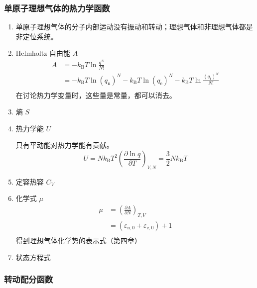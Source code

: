\subsubsection{单原子理想气体的热力学函数}

\begin{enumerate}
    \item 单原子理想气体的分子内部运动没有振动和转动；理想气体和非理想气体都是非定位系统。
    \item Helmholtz 自由能 $A$
    \begin{equation}
        \begin{aligned}
            A &= -k_\mathrm{B} T \ln{\frac{q^N}{N!}} \\
            &= -k_\mathrm{B} T \ln{\left(q_{\mathrm{n}}\right)^N}
            -k_\mathrm{B} T \ln{\left(q_{\mathrm{e}}\right)^N}
            -k_\mathrm{B} T \ln{\frac{\left(q_{\mathrm{t}}\right)^N}{N!}} \\
        \end{aligned}
    \end{equation}
    在讨论热力学变量时，这些量是常量，都可以消去。
    \item 熵 $S$
    \item 热力学能 $U$
    
    只有平动能对热力学能有贡献。
    \begin{equation}
        U = N k_\mathrm{B} T^2 \left(\frac{\partial \ln{q}}{\partial T}\right)_{V,N} = \frac32 N k_\mathrm{B} T
    \end{equation}
    \item 定容热容 $C_V$
    \item 化学式 $\mu$
    \begin{equation}
        \begin{aligned}
            \mu &= \left(\frac{\partial A}{\partial N}\right)_{T,V} \\
            &= (\varepsilon_{\mathrm{n},0} + \varepsilon_{\mathrm{e},0}) + 1\\
        \end{aligned}
    \end{equation}
    得到理想气体化学势的表示式（第四章）
    \item 状态方程式
\end{enumerate}

\subsubsection{转动配分函数}

